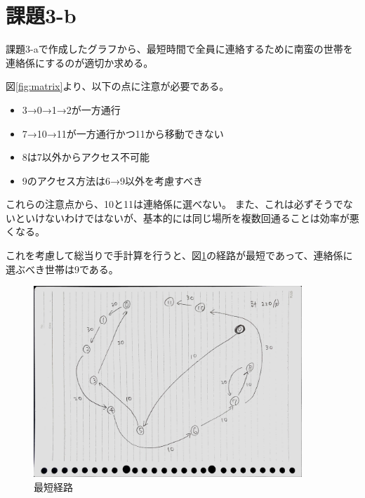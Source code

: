 \documentclass[a4paper,11pt]{bxjsarticle}
\begin{document}
    \newpage

    \section{課題3-b}

    課題3-aで作成したグラフから、最短時間で全員に連絡するために南蛮の世帯を連絡係にするのが適切か求める。
    
    図\ref{fig:matrix}より、以下の点に注意が必要である。

    \begin{itemize}
        \item 3→0→1→2が一方通行
        \item 7→10→11が一方通行かつ11から移動できない
        \item 8は7以外からアクセス不可能
        \item 9のアクセス方法は6→9以外を考慮すべき
    \end{itemize}

    これらの注意点から、10と11は連絡係に選べない。
    また、これは必ずそうでないといけないわけではないが、基本的には同じ場所を複数回通ることは効率が悪くなる。

    これを考慮して総当りで手計算を行うと、図\ref{fig:shortest}の経路が最短であって、連絡係に選ぶべき世帯は9である。

    \begin{figure}[tbh]
        \begin{center}
            \includegraphics[width=0.9\textwidth]{shortest.JPG}
            \caption{最短経路}
            \label{fig:shortest}
        \end{center}
    \end{figure}
\end{document}
